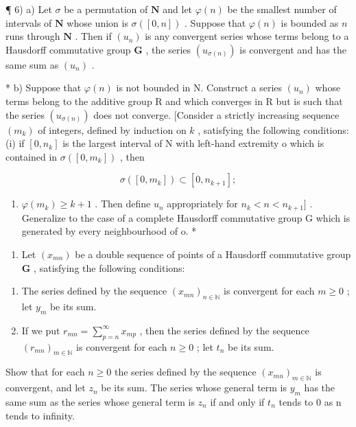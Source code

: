 ¶ 6) a) Let \(\sigma\) be a permutation of \(\mathbf{N}\) and let \(\varphi(n)\) be the smallest number of intervals of \(\mathbf{N}\) whose union is \(\sigma([0, n])\) . Suppose that \(\varphi(n)\) is bounded as \(n\) runs through \(\mathbf{N}\) . Then if \((u_n)\) is any convergent series whose terms belong to a Hausdorff commutative group \(\mathbf{G}\) , the series \((u_{\sigma(n)})\) is convergent and has the same sum as \((u_n)\) .

* b) Suppose that \(\varphi(n)\) is not bounded in N. Construct a series \((u_n)\) whose terms belong to the additive group R and which converges in R but is such that the series \((u_{\sigma(n)})\) does not converge. {[}Consider a strictly increasing sequence \((m_k)\) of integers, defined by induction on \(k\) , satisfying the following conditions: (i) if \([0, n_k]\) is the largest interval of N with left-hand extremity o which is contained in \(\sigma([0, m_k])\) , then

\[
\sigma ([ 0, m _ {k} ]) \subset [ 0, n _ {k + 1} ];
\]

\begin{enumerate}
\def\labelenumi{(\roman{enumi})}
\setcounter{enumi}{1}
\tightlist
\item
  \(\varphi(m_k) \geqslant k + 1\) . Then define \(u_n\) appropriately for \(n_k < n < n_{k+1}]\) . Generalize to the case of a complete Hausdorff commutative group G which is generated by every neighbourhood of o. *
\end{enumerate}

\begin{enumerate}
\def\labelenumi{\arabic{enumi})}
\setcounter{enumi}{6}
\tightlist
\item
  Let \((x_{mn})\) be a double sequence of points of a Hausdorff commutative group \(\mathbf{G}\) , satisfying the following conditions:
\end{enumerate}

\begin{enumerate}
\def\labelenumi{(\alph{enumi})}
\item
  The series defined by the sequence \((x_{mn})_{n\in \mathbb{N}}\) is convergent for each \(m\geqslant 0\) ; let \(y_{m}\) be its sum.
\item
  If we put \(r_{mn} = \sum_{p=n}^{\infty} x_{mp}\) , then the series defined by the sequence \((r_{mn})_{m \in \mathbb{N}}\) is convergent for each \(n \geqslant 0\) ; let \(t_n\) be its sum.
\end{enumerate}

Show that for each \(n \geqslant 0\) the series defined by the sequence \((x_{mn})_{m \in \mathbb{N}}\) is convergent, and let \(z_{n}\) be its sum. The series whose general term is \(y_{m}\) has the same sum as the series whose general term is \(z_{n}\) if and only if \(t_{n}\) tends to 0 as n tends to infinity.

